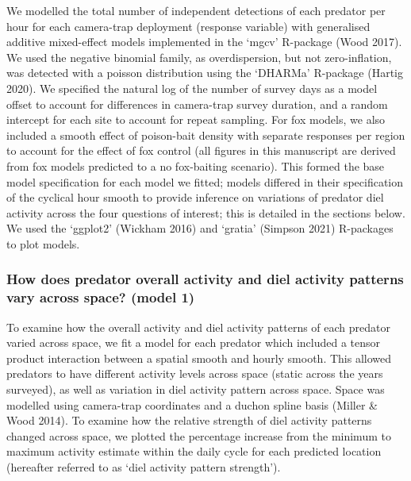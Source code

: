 \documentclass[11pt,a4paper,titlepage,twoside,openright]{style/unimelbthesis}
\begin{document}
\begin{mainmatter}
We modelled the total number of independent detections of each predator per hour for each camera-trap deployment (response variable) with generalised additive mixed-effect models implemented in the `mgcv' R-package (Wood 2017). We used the negative binomial family, as overdispersion, but not zero-inflation, was detected with a poisson distribution using the `DHARMa' R-package (Hartig 2020). We specified the natural log of the number of survey days as a model offset to account for differences in camera-trap survey duration, and a random intercept for each site to account for repeat sampling. For fox models, we also included a smooth effect of poison-bait density with separate responses per region to account for the effect of fox control (all figures in this manuscript are derived from fox models predicted to a no fox-baiting scenario). This formed the base model specification for each model we fitted; models differed in their specification of the cyclical hour smooth to provide inference on variations of predator diel activity across the four questions of interest; this is detailed in the sections below. We used the `ggplot2' (Wickham 2016) and `gratia' (Simpson 2021) R-packages to plot models.

\hypertarget{how-does-predator-overall-activity-and-diel-activity-patterns-vary-across-space-model-1}{%
\subsubsection{How does predator overall activity and diel activity patterns vary across space? (model 1)}\label{how-does-predator-overall-activity-and-diel-activity-patterns-vary-across-space-model-1}}

To examine how the overall activity and diel activity patterns of each predator varied across space, we fit a model for each predator which included a tensor product interaction between a spatial smooth and hourly smooth. This allowed predators to have different activity levels across space (static across the years surveyed), as well as variation in diel activity pattern across space. Space was modelled using camera-trap coordinates and a duchon spline basis (Miller \& Wood 2014). To examine how the relative strength of diel activity patterns changed across space, we plotted the percentage increase from the minimum to maximum activity estimate within the daily cycle for each predicted location (hereafter referred to as `diel activity pattern strength').

\hypertarget{how-does-predator-overall-activity-and-diel-activity-patterns-vary-across-vegetation-types-model-2}{%
}
\end{mainmatter}
\end{document}
